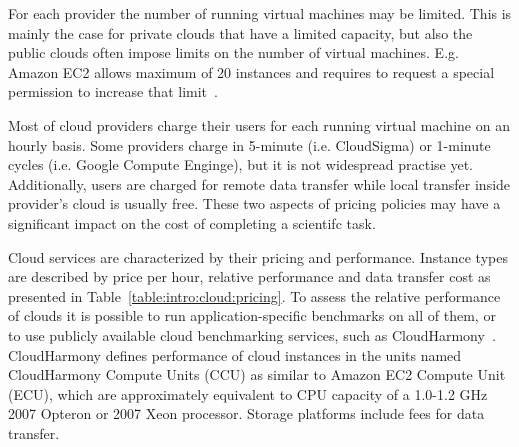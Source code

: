 {For each provider the number of running virtual machines may be limited.  This is mainly the case for private clouds that have a limited capacity, but also the public clouds often impose limits on the number of virtual machines. E.g. Amazon EC2 allows maximum of 20 instances and requires to request a special permission to increase that limit~\cite{AmazonEC2FAQ}. 

Most of cloud providers charge their users for each running virtual machine on an hourly basis. Some providers charge in 5-minute (i.e. CloudSigma) or 1-minute cycles (i.e. Google Compute Enginge), but it is not widespread practise yet. Additionally, users are charged for remote data transfer while local transfer inside provider's cloud is usually free. These two aspects of pricing policies may have a significant impact on the cost of completing a scientifc task.

Cloud services are characterized by their pricing and performance. Instance types are described by price per hour, relative performance and data transfer cost as presented in Table~\ref{table:intro:cloud:pricing}. To assess the relative performance of clouds it is possible to run application-specific benchmarks on all of them, or to use publicly available cloud benchmarking services, such as CloudHarmony~\cite{CloudHarmony}. CloudHarmony defines performance of cloud instances in the units named CloudHarmony Compute Units (CCU) as similar to Amazon EC2 Compute Unit (ECU), which are approximately equivalent to CPU capacity of a 1.0-1.2 GHz 2007 Opteron or 2007 Xeon processor. Storage platforms include fees for data transfer.

}
